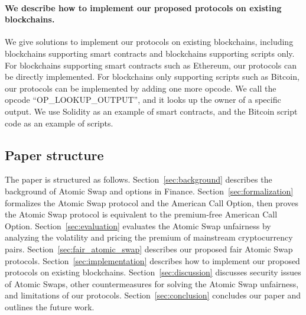 \paragraph{We describe how to implement our proposed protocols on existing blockchains.}
We give solutions to implement our protocols on existing blockchains, including blockchains supporting smart contracts and blockchains supporting scripts only.
For blockchains supporting smart contracts such as Ethereum, our protocols can be directly implemented.
For blockchains only supporting scripts such as Bitcoin, our protocols can be implemented by adding one more opcode.
We call the opcode ``OP\_LOOKUP\_OUTPUT'', and it looks up the owner of a specific output.
We use Solidity as an example of smart contracts, and the Bitcoin script code as an example of scripts.










\subsection{Paper structure}

The paper is structured as follows.
Section~\ref{sec:background} describes the background of Atomic Swap and options in Finance.
Section~\ref{sec:formalization} formalizes the Atomic Swap protocol and the American Call Option, then proves the Atomic Swap protocol is equivalent to the premium-free American Call Option.
Section~\ref{sec:evaluation} evaluates the Atomic Swap unfairness by analyzing the volatility and pricing the premium of mainstream cryptocurrency pairs.
Section~\ref{sec:fair_atomic_swap} describes our proposed fair Atomic Swap protocols.
Section~\ref{sec:implementation} describes how to implement our proposed protocols on existing blockchains.
Section~\ref{sec:discussion} discusses security issues of Atomic Swaps, other countermeasures for solving the Atomic Swap unfairness, and limitations of our protocols.
Section~\ref{sec:conclusion} concludes our paper and outlines the future work.

